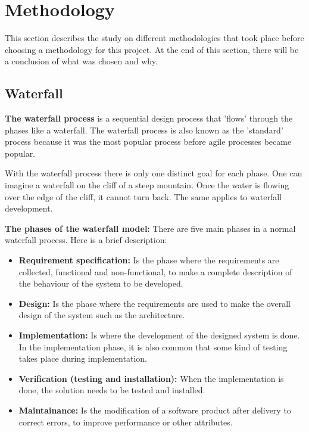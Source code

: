 \section{Methodology}

This section describes the study on different methodologies that took place before choosing a methodology
for this project. At the end of this section, there will be a conclusion of what was chosen and why.

\subsection{Waterfall}

{\bf The waterfall process } is a sequential design process that 'flows' through the phases like a waterfall.
The waterfall process is also known as the 'standard' process because it was the most popular process before
agile processes became popular. 

With the waterfall process there is only one distinct goal for each phase. One can imagine a waterfall on the cliff of a steep mountain. Once the water is flowing over the edge of the cliff, it cannot turn back. The same applies to waterfall development. \cite{wikiWaterfall, techtargetWaterfall}

{\bf The phases of the waterfall model:} There are five main phases in a normal waterfall process. 
Here is a brief description:
\begin{itemize}
	\item {\bf Requirement specification:} Is the phase where the requirements are collected, functional and non-functional, to make a complete description of the behaviour of the system to be developed.
	\item {\bf Design: } Is the phase where the requirements are used to make the overall design of the system such as the
	architecture.
	\item {\bf Implementation:} Is where the development of the designed system is done. In the implementation phase, 
	it is also common that some kind of testing takes place during implementation.
	\item {\bf Verification (testing and installation): } When the implementation is done, the solution needs to be tested and installed.
	\item {\bf Maintainance:} Is the modification of a software product after delivery to correct errors, to improve performance or other attributes.
\end{itemize}

